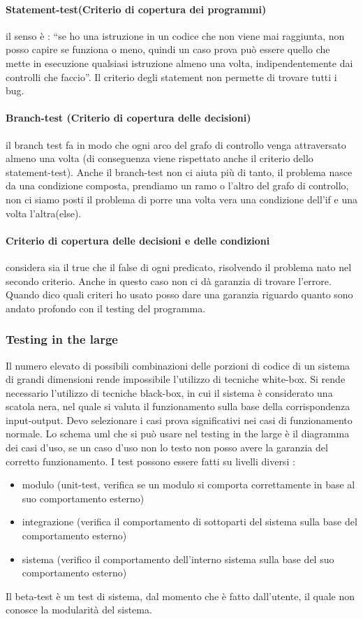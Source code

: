 \documentclass[a4paper,12pt]{report}
\begin{document}
	\paragraph{Statement-test(Criterio di copertura dei programmi)}
	il senso è : “se ho una istruzione in un codice che non viene mai raggiunta, non posso capire se funziona o meno, quindi un caso prova può essere quello che mette in esecuzione qualsiasi istruzione almeno una volta, indipendentemente dai controlli che faccio”. Il criterio degli statement non permette di trovare tutti i bug.
	\paragraph{Branch-test (Criterio di copertura delle decisioni)}
	il branch test fa in modo che ogni arco del grafo di controllo venga attraversato almeno una volta (di conseguenza viene rispettato anche il criterio dello statement-test). Anche il branch-test non ci aiuta più di tanto, il problema nasce da una condizione composta, prendiamo un ramo o l’altro del grafo di controllo, non ci siamo posti il problema di porre una volta vera una condizione dell’if e una volta l’altra(else).
	\paragraph{Criterio di copertura delle decisioni e delle condizioni} 
	 considera sia il true che il false di ogni predicato, risolvendo il problema nato nel secondo criterio. Anche in questo caso non ci dà garanzia di trovare l’errore.
	 Quando dico quali criteri ho usato posso dare una garanzia riguardo quanto sono andato profondo con il testing del programma.
	\subsubsection{Testing in the large}
	Il numero elevato di possibili combinazioni delle porzioni di codice di un sistema di grandi dimensioni rende impossibile l'utilizzo di tecniche white-box. Si rende necessario l'utilizzo di tecniche black-box, in cui il sistema è considerato una scatola nera, nel quale si valuta il funzionamento sulla base della corrispondenza input-output.
	Devo selezionare i casi prova significativi nei casi di funzionamento normale. Lo schema uml che si può usare nel testing in the large è il diagramma dei casi d’uso, se un caso d’uso non lo testo non posso avere la garanzia del corretto funzionamento. I test possono essere fatti su livelli diversi : 
	\begin{itemize}
		\item modulo (unit-test, verifica se un modulo si comporta correttamente in base al suo comportamento esterno)
		\item integrazione (verifica il comportamento di sottoparti del sistema sulla base del comportamento esterno)
		\item sistema (verifico il comportamento dell'interno sistema sulla base del  suo comportamento esterno)
	\end{itemize}
	Il beta-test è un test di sistema, dal momento che è fatto dall’utente, il quale non conosce la modularità del sistema.
\end{document}
